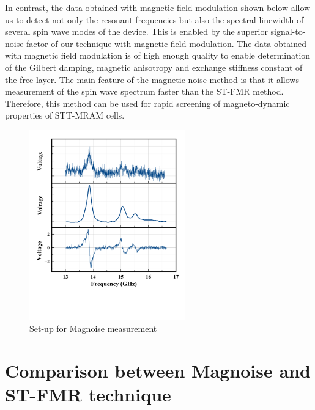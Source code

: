 In contrast, the data obtained with magnetic field modulation shown below allow us to detect not only the resonant frequencies but also the spectral linewidth of several spin wave modes of the device. This is enabled by the superior signal-to-noise factor of our technique with magnetic field modulation. The data obtained with magnetic field modulation is of high enough quality to enable determination of the Gilbert damping, magnetic anisotropy and exchange stiffness constant of the free layer. The main feature of the magnetic noise method is that it allows measurement of the spin wave spectrum faster than the ST-FMR method.  Therefore, this method can be used for rapid screening of magneto-dynamic properties of STT-MRAM cells.




\begin{figure}[!ht]
  \centering
  \includegraphics[width=0.6\textwidth]{fig/magnoise/magnoise-data.png}
   \caption{Set-up for Magnoise measurement}
  \label{fig:magnoisedata}
\end{figure}



\section{Comparison between Magnoise and ST-FMR technique }